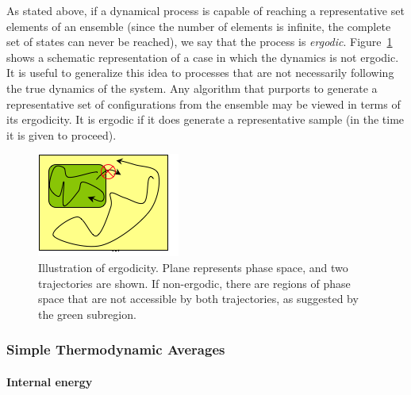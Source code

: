 \documentclass[]{article}
\let\oldparagraph\paragraph
\renewcommand{\paragraph}[1]{\oldparagraph{#1}\mbox{}}
\begin{document}
As stated above, if a dynamical process is capable of reaching a
representative set elements of an ensemble (since the number of elements
is infinite, the complete set of states can never be reached), we say
that the process is \emph{ergodic}. Figure~\ref{fig:ergodicity} shows a schematic
representation of a case in which the dynamics is not ergodic. It is
useful to generalize this idea to processes that are not necessarily
following the true dynamics of the system. Any algorithm that purports
to generate a representative set of configurations from the ensemble may
be viewed in terms of its ergodicity. It is ergodic if it does generate a
representative sample (in the time it is given to proceed).

\begin{figure}
\includegraphics[width=\textwidth]{image036}
\caption{\label{fig:ergodicity}Illustration of ergodicity. Plane represents phase space, and two trajectories are shown. If non-ergodic, there are regions of phase space that are not accessible by both trajectories, as suggested by the green subregion.}
\end{figure}


\subsubsection{Simple Thermodynamic
Averages}\label{simple-thermodynamic-averages}

\paragraph{Internal energy}\label{internal-energy}
\end{document}
